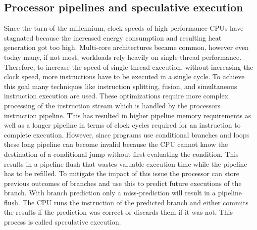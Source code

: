 \documentclass[conference,compsoc,final,a4paper]{IEEEtran}
\begin{document}
\subsection{Processor pipelines and speculative execution}
Since the turn of the millennium, clock speeds of high performance CPUs have stagnated because the increased energy consumption and resulting heat generation got
too high. \cite{fog2012microarchitecture} Multi-core architectures became common, however even today many, if not most,
workloads rely heavily on single thread performance. Therefore, to increase the speed of single thread execution, without increasing the clock speed,
more instructions have to be executed in a single cycle. To achieve this goal many techniques like instruction splitting, fusion,
and simultaneous instruction execution are used. \cite{fog2012microarchitecture} These optimizations require more complex processing of the instruction stream which
is handled by the processors instruction pipeline. This has resulted in higher pipeline memory requirements as well as a longer pipeline in terms of clock cycles
required for an instruction to complete execution. However, since programs use conditional branches and loops these long pipeline can become invalid because the CPU
cannot know the destination of a conditional jump without first evaluating the condition. This results in a pipeline flush that wastes valuable execution time while
the pipeline has to be refilled. To mitigate the impact of this issue the processor can store previous outcomes of branches and use this to predict future executions of the
branch. With branch prediction only a miss-prediction will result in a pipeline flush. The CPU runs the instruction of the predicted branch and either commits
the results if the prediction was correct or discards them if it was not.
This process is called speculative execution. \cite{kocher2018spectre}
\end{document}
